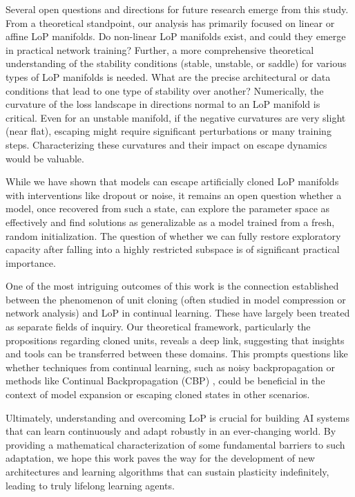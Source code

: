 \documentclass{article}
\newcommand{\AJ}[1]{\todo[color=green!30,size=\tiny]{AJ: #1}}
\newcommand{\GIU}[1]{\todo[color=purple!30,size=\tiny]{GIU: #1}}
\numberwithin{figure}{section}
\begin{document}
Several open questions and directions for future research emerge from this study.
From a theoretical standpoint, our analysis has primarily focused on linear or affine LoP manifolds. Do non-linear LoP manifolds exist, and could they emerge in practical network training? Further, a more comprehensive theoretical understanding of the stability conditions (stable, unstable, or saddle) for various types of LoP manifolds is needed. What are the precise architectural or data conditions that lead to one type of stability over another? 
Numerically, the curvature of the loss landscape in directions normal to an LoP manifold is critical. Even for an unstable manifold, if the negative curvatures are very slight (near flat), escaping might require significant perturbations or many training steps. Characterizing these curvatures and their impact on escape dynamics would be valuable.

While we have shown that models can escape artificially cloned LoP manifolds with interventions like dropout or noise, it remains an open question whether a model, once recovered from such a state, can explore the parameter space as effectively and find solutions as generalizable as a model trained from a fresh, random initialization. The question of whether we can fully restore exploratory capacity after falling into a highly restricted subspace is of significant practical importance.

One of the most intriguing outcomes of this work is the connection established between the phenomenon of unit cloning (often studied in model compression or network analysis) and LoP in continual learning. These have largely been treated as separate fields of inquiry. Our theoretical framework, particularly the propositions regarding cloned units, reveals a deep link, suggesting that insights and tools can be transferred between these domains.  This prompts questions like whether techniques from continual learning, such as noisy backpropagation or methods like Continual Backpropagation (CBP) \citep{dohare2024loss}, could be beneficial in the context of model expansion or escaping cloned states in other scenarios.

Ultimately, understanding and overcoming LoP is crucial for building AI systems that can learn continuously and adapt robustly in an ever-changing world. By providing a mathematical characterization of some fundamental barriers to such adaptation, we hope this work paves the way for the development of new architectures and learning algorithms that can sustain plasticity indefinitely, leading to truly lifelong learning agents.
\end{document}
